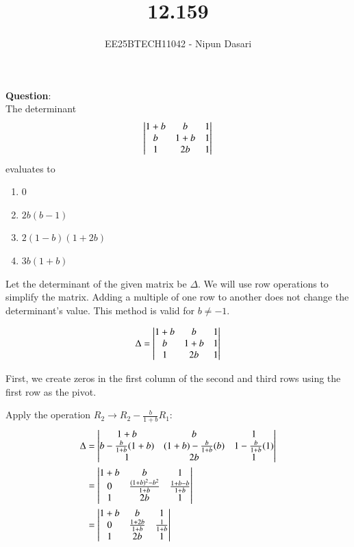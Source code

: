 \documentclass[journal]{IEEEtran}
\begin{document}
	
	
	\vspace{3cm}
	
	\title{12.159}
	\author{EE25BTECH11042 - Nipun Dasari}
	\maketitle
	
	\renewcommand{\thefigure}{\theenumi}
	\renewcommand{\thetable}{\theenumi}
	\setlength{\intextsep}{10pt}
	
	\renewcommand{\thetable}{\theenumi}
	
	\textbf{Question}:\\
	The determinant
	\begin{align}
		\begin{vmatrix}1+b & b & 1 \\ b & 1+b & 1 \\ 1 & 2b & 1\end{vmatrix}
	\end{align}
	evaluates to
	\begin{enumerate}[label=\alph*)]
		\item $0$
		\item $2b(b-1)$
		\item $2(1-b)(1+2b)$
		\item $3b(1+b)$
	\end{enumerate}
	
	\solution
	
	Let the determinant of the given matrix be $\Delta$. We will use row operations to simplify the matrix. Adding a multiple of one row to another does not change the determinant's value. This method is valid for $b \neq -1$.
	
	\begin{align}
		\Delta = \begin{vmatrix}1+b & b & 1 \\ b & 1+b & 1 \\ 1 & 2b & 1\end{vmatrix}
	\end{align}
	
	First, we create zeros in the first column of the second and third rows using the first row as the pivot.
	
	Apply the operation $R_2 \to R_2 - \frac{b}{1+b}R_1$:
	\begin{align}
		\Delta &= \begin{vmatrix}1+b & b & 1 \\ b - \frac{b}{1+b}(1+b) & (1+b) - \frac{b}{1+b}(b) & 1 - \frac{b}{1+b}(1) \\ 1 & 2b & 1\end{vmatrix} \\
		&= \begin{vmatrix}1+b & b & 1 \\ 0 & \frac{(1+b)^2 - b^2}{1+b} & \frac{1+b-b}{1+b} \\ 1 & 2b & 1\end{vmatrix} \\
		&= \begin{vmatrix}1+b & b & 1 \\ 0 & \frac{1+2b}{1+b} & \frac{1}{1+b} \\ 1 & 2b & 1\end{vmatrix}
	\end{align}
	
\end{document}
